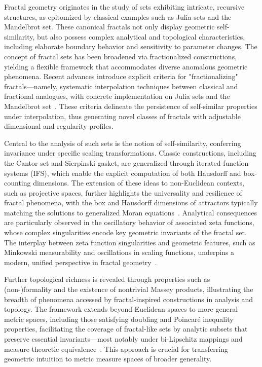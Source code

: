 \documentclass[sigconf]{acmart}
\begin{document}
Fractal geometry originates in the study of sets exhibiting intricate, recursive structures, as epitomized by classical examples such as Julia sets and the Mandelbrot set. These canonical fractals not only display geometric self-similarity, but also possess complex analytical and topological characteristics, including elaborate boundary behavior and sensitivity to parameter changes. The concept of fractal sets has been broadened via fractionalized constructions, yielding a flexible framework that accommodates diverse anomalous geometric phenomena. Recent advances introduce explicit criteria for "fractionalizing" fractals—namely, systematic interpolation techniques between classical and fractional analogues, with concrete implementation on Julia sets and the Mandelbrot set~\cite{ref106}. These criteria delineate the persistence of self-similar properties under interpolation, thus generating novel classes of fractals with adjustable dimensional and regularity profiles.

Central to the analysis of such sets is the notion of self-similarity, conferring invariance under specific scaling transformations. Classic constructions, including the Cantor set and Sierpinski gasket, are generalized through iterated function systems (IFS), which enable the explicit computation of both Hausdorff and box-counting dimensions. The extension of these ideas to non-Euclidean contexts, such as projective spaces, further highlights the universality and resilience of fractal phenomena, with the box and Hausdorff dimensions of attractors typically matching the solutions to generalized Moran equations~\cite{ref24,ref33}. Analytical consequences are particularly observed in the oscillatory behavior of associated zeta functions, whose complex singularities encode key geometric invariants of the fractal set. The interplay between zeta function singularities and geometric features, such as Minkowski measurability and oscillations in scaling functions, underpins a modern, unified perspective in fractal geometry~\cite{ref21,ref23,ref33}.

Further topological richness is revealed through properties such as (non-)formality and the existence of nontrivial Massey products, illustrating the breadth of phenomena accessed by fractal-inspired constructions in analysis and topology. The framework extends beyond Euclidean spaces to more general metric spaces, including those satisfying doubling and Poincaré inequality properties, facilitating the coverage of fractal-like sets by analytic subsets that preserve essential invariants—most notably under bi-Lipschitz mappings and measure-theoretic equivalence~\cite{ref23,ref93,ref6}. This approach is crucial for transferring geometric intuition to metric measure spaces of broader generality.
\end{document}
